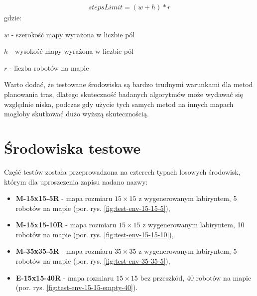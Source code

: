 \begin{gather}
 	stepsLimit = (w + h) * r
 	\label{eq:steps-limit} 
\end{gather}
 gdzie:

 $w$ - szerokość mapy wyrażona w liczbie pól

 $h$ - wysokość mapy wyrażona w liczbie pól

 $r$ - liczba robotów na mapie

Warto dodać, że testowane środowiska są bardzo trudnymi warunkami dla metod planowania tras, dlatego skuteczność badanych algorytmów może wydawać się względnie niska, podczas gdy użycie tych samych metod na innych mapach mogłoby skutkować dużo wyższą skutecznością.

\section{Środowiska testowe}
Część testów została przeprowadzona na czterech typach losowych środowisk, którym dla uproszczenia zapisu nadano nazwy:
\begin{itemize}
	\item {\bf M-15x15-5R} - mapa rozmiaru $15 \times 15$ z wygenerowanym labiryntem, 5 robotów na mapie (por. rys. \ref{fig:test-env-15-15-5}),
	\item {\bf M-15x15-10R} - mapa rozmiaru $15 \times 15$ z wygenerowanym labiryntem, 10 robotów na mapie (por. rys. \ref{fig:test-env-15-15-10}),
	\item {\bf M-35x35-5R} - mapa rozmiaru $35 \times 35$ z wygenerowanym labiryntem, 5 robotów na mapie (por. rys. \ref{fig:test-env-35-35-5}),
	\item {\bf E-15x15-40R} - mapa rozmiaru $15 \times 15$ bez przeszkód, 40 robotów na mapie (por. rys. \ref{fig:test-env-15-15-empty-40}).
\end{itemize}

